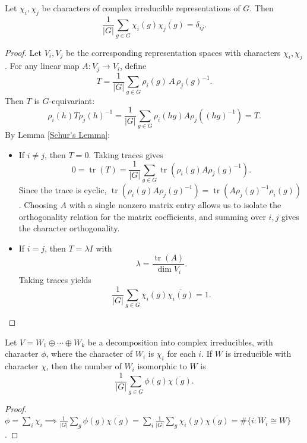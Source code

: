 \begin{thm}
\label{Schur Orthogonality Relations}

Let \(\chi_i, \chi_j\) be characters of complex irreducible representations of \(G\). Then
\[
\frac{1}{|G|} \sum_{g \in G} \chi_i(g) \overline{\chi_j(g)} = \delta_{ij}.
\]
\end{thm}

\begin{proof}
Let \(V_i, V_j\) be the corresponding representation spaces with characters \(\chi_i, \chi_j\). For any linear map \(A : V_j \to V_i\), define
\[
T = \frac{1}{|G|} \sum_{g \in G} \rho_i(g) \, A \, \rho_j(g)^{-1}.
\]
Then \(T\) is \(G\)-equivariant:
\[
\rho_i(h) T \rho_j(h)^{-1}
= \frac{1}{|G|} \sum_{g \in G} \rho_i(hg) A \rho_j((hg)^{-1})
= T.
\]
By Lemma \ref{Schur's Lemma}:
\begin{itemize}
\item If \(i \neq j\), then \(T = 0\). Taking traces gives
\[
0 = \operatorname{tr}(T) = \frac{1}{|G|} \sum_{g \in G} \operatorname{tr}(\rho_i(g) A \rho_j(g)^{-1}).
\]
Since the trace is cyclic, \(\operatorname{tr}(\rho_i(g) A \rho_j(g)^{-1}) = \operatorname{tr}(A \rho_j(g)^{-1} \rho_i(g))\). Choosing \(A\) with a single nonzero matrix entry allows us to isolate the orthogonality relation for the matrix coefficients, and summing over \(i,j\) gives the character orthogonality.
\item If \(i = j\), then \(T = \lambda I\) with
\[
\lambda = \frac{\operatorname{tr}(A)}{\dim V_i}.
\]
Taking traces yields
\[
\frac{1}{|G|} \sum_{g \in G} \chi_i(g) \overline{\chi_i(g)} = 1.
\]
\end{itemize}

\end{proof}

\begin{cor}
\label{number of decomposition}
Let $V = W_1 \oplus \cdots \oplus W_k$ be a decomposition into complex irreducibles, with character $\phi$, where the character of $W_i$ is $\chi_i$ for each $i$. If $W$ is irreducible with character $\chi$, then the number of $W_i$ isomorphic to $W$ is
\[
\frac{1}{|G|} \sum_{g \in G} \phi(g) \overline{\chi(g)}.
\]
\end{cor}

\begin{proof}
$\phi = \sum_i \chi_i \implies \frac{1}{|G|} \sum_g \phi(g) \overline{\chi(g)} = \sum_i \frac{1}{|G|} \sum_g \chi_i(g) \overline{\chi(g)} = \#\{i : W_i \cong W\}$.
\end{proof}

